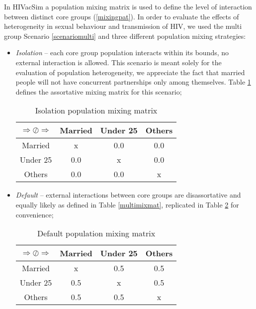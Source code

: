 In HIVacSim a population mixing matrix is used to define the level of interaction between
distinct core groups (\ref{mixingpat}). In order to evaluate the effects of heterogeneity
in sexual behaviour and transmission of HIV, we used the multi group Scenario
\ref{scenariomulti} and three different population mixing strategies:
\parskip=0pt
\begin{itemize}
    \item \emph{Isolation} --  each core group population interacts within its bounds,
    no external interaction is allowed. This scenario is meant solely for the evaluation of
    population heterogeneity, we appreciate the fact that married people will not have
    concurrent partnerships only among themselves. Table \ref{isolationmixmat} defines
    the assortative mixing matrix for this scenario;
    \begin{longtable}[c]{|c|c|c|c|}
    \caption{Isolation population mixing matrix}\\ \hline
    \label{isolationmixmat}
    $\Rightarrow \oslash \Rightarrow $ & Married & Under 25 & Others \\\hline
    Married  & x       & 0.0      & 0.0    \\\hline
    Under 25 & 0.0     & x        & 0.0    \\\hline
    Others   & 0.0     & 0.0      & x      \\\hline
    \end{longtable}

    \item \emph{Default} -- external interactions between core groups are disassortative
    and equally likely as defined in Table \ref{multimixmat}, replicated in
    Table \ref{defaultmixmat} for convenience;
    \begin{longtable}[c]{|c|c|c|c|}
    \caption{Default population mixing matrix}\\ \hline
    \label{defaultmixmat}
    $\Rightarrow \oslash \Rightarrow $ & Married & Under 25 & Others \\\hline
    Married  & x       & 0.5      & 0.5    \\\hline
    Under 25 & 0.5     & x        & 0.5    \\\hline
    Others   & 0.5     & 0.5      & x      \\\hline
    \end{longtable}


\end{itemize}
